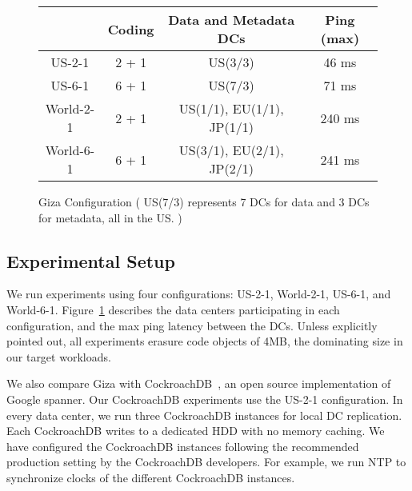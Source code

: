 \begin{figure}
\footnotesize
\centering
\begin{tabular}{c|c|c|c}
          & Coding & Data and Metadata DCs & Ping (max)\\
\hline
US-2-1 	  & 2 + 1 & US(3/3)                   & 46 ms \\
US-6-1 	  & 6 + 1 & US(7/3)                   & 71 ms\\ 
World-2-1 & 2 + 1 & US(1/1), EU(1/1), JP(1/1) & 240 ms\\
World-6-1 & 6 + 1 & US(3/1), EU(2/1), JP(2/1) & 241 ms\\
\end{tabular}
\caption{Giza Configuration ( US(7/3) represents 7 DCs for data and 3 DCs for metadata, all in the US. )} 
\label{fig:dcconfig} 
\end{figure}

\subsection{Experimental Setup}
We run experiments using four configurations: US-2-1, World-2-1, US-6-1, and World-6-1. Figure~\ref{fig:dcconfig} describes the data centers participating in each configuration, and the max ping latency between the DCs. Unless explicitly pointed out, all experiments erasure code objects of 4MB, the dominating size in our target workloads.

We also compare Giza with CockroachDB~\cite{cockroachdb}, an open source implementation of Google spanner. Our CockroachDB experiments use the US-2-1 configuration. In every data center, we run three CockroachDB instances for local DC replication. Each CockroachDB writes to a dedicated HDD with no memory caching. We have configured the CockroachDB instances following the recommended production setting by the CockroachDB developers. For example, we run NTP to synchronize clocks of the different CockroachDB instances.


